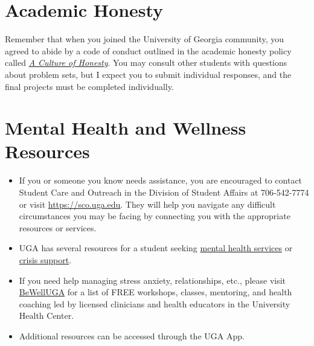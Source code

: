 \documentclass[11pt, letterpaper]{article}
\begin{document}



\section*{Academic Honesty}
Remember that when you joined the University of Georgia community, you agreed to abide by a code of conduct outlined in the academic honesty policy called \href{https://honesty.uga.edu/Academic-Honesty-Policy/Introduction/}{\textit{A Culture of Honesty}}. You may consult other students with questions about problem sets, but I expect you to submit individual responses, and the final projects must be completed individually.

\section*{Mental Health and Wellness Resources}

\begin{itemize}
\item If you or someone you know needs assistance, you are encouraged to contact Student Care and Outreach in the Division of Student Affairs at 706-542-7774 or visit \href{https://sco.uga.edu}{https://sco.uga.edu}. They will help you navigate any difficult circumstances you may be facing by connecting you with the appropriate resources or services.
\item UGA has several resources for a student seeking \href{https://www.uhs.uga.edu/bewelluga/bewelluga}{mental health services} or \href{https://www.uhs.uga.edu/info/emergencies}{crisis support}.
\item If you need help managing stress anxiety, relationships, etc., please visit \href{https://www.uhs.uga.edu/bewelluga/bewelluga}{BeWellUGA} for a list of FREE workshops, classes, mentoring, and health coaching led by licensed clinicians and health educators in the University Health Center.
\item Additional resources can be accessed through the UGA App.
\end{itemize}



\end{document}
